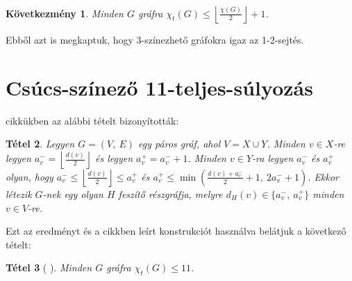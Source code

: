 \documentclass[12pt, a4paper]{report}
\newtheorem{tét}{Tétel}[section]
\newtheorem{köv}[tét]{Következmény}
\theoremstyle{remark}
\theoremstyle{definition}
\begin{document}
\begin{köv} \label{cor:totalchromatic}
Minden $G$ gráfra $\chi_t(G) \leq \left\lfloor \frac{\chi(G)}{2} \right\rfloor + 1$.
\end{köv}

Ebből azt is megkaptuk, hogy $3$-színezhető gráfokra igaz az 1-2-sejtés.

\section{Csúcs-színező 11-teljes-súlyozás}
\citeauthor{AddarioBerry2008} \cite{AddarioBerry2008} cikkükben az alábbi tételt bizonyították:

\begin{tét} \label{thm:degreeconstbipartite}
Legyen $G=(V,\ E)$ egy páros gráf, ahol $V = X \cup Y$. Minden $v \in X$-re legyen $a_v^- = \left\lfloor \frac{d(v)}{2} \right\rfloor$ és legyen $a_v^+ = a_v^- + 1$. Minden $v \in Y$-ra legyen $a_v^-$ és $a_v^+$ olyan, hogy $a_v^- \leq \left\lfloor \frac{d(v)}{2} \right\rfloor \leq a_v^+$ és $a_v^+ \leq \min \left( \frac{d(v) + a_v^-}{2} + 1,\ 2a_v^- + 1 \right)$. Ekkor létezik $G$-nek egy olyan $H$ feszítő részgráfja, melyre $d_H(v) \in \lbrace a_v^-,\ a_v^+ \rbrace$ minden $v \in V$-re.
\end{tét}

Ezt az eredményt és a cikkben leírt konstrukciót használva belátjuk a következő tételt:

\begin{tét}[\citeauthor{Przybylo2010} \cite{Przybylo2010}]
Minden $G$ gráfra $\chi_t(G) \leq 11$.
\end{tét}
\end{document}
